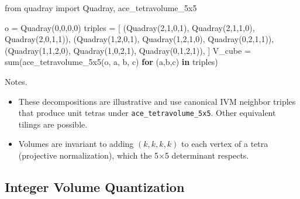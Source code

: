\documentclass[
]{article}
\newenvironment{Shaded}{}{}
\newcommand{\BuiltInTok}[1]{#1}
\newcommand{\ControlFlowTok}[1]{\textcolor[rgb]{0.00,0.44,0.13}{\textbf{#1}}}
\newcommand{\DecValTok}[1]{\textcolor[rgb]{0.25,0.63,0.44}{#1}}
\newcommand{\ImportTok}[1]{#1}
\newcommand{\KeywordTok}[1]{\textcolor[rgb]{0.00,0.44,0.13}{\textbf{#1}}}
\newcommand{\NormalTok}[1]{#1}
\newcommand{\OperatorTok}[1]{\textcolor[rgb]{0.40,0.40,0.40}{#1}}
\providecommand{\tightlist}{%
  \setlength{\itemsep}{0pt}\setlength{\parskip}{0pt}}
\begin{document}
\begin{Shaded}
\begin{Highlighting}[]
\ImportTok{from}\NormalTok{ quadray }\ImportTok{import}\NormalTok{ Quadray, ace\_tetravolume\_5x5}

\NormalTok{o }\OperatorTok{=}\NormalTok{ Quadray(}\DecValTok{0}\NormalTok{,}\DecValTok{0}\NormalTok{,}\DecValTok{0}\NormalTok{,}\DecValTok{0}\NormalTok{)}
\NormalTok{triples }\OperatorTok{=}\NormalTok{ [}
\NormalTok{    (Quadray(}\DecValTok{2}\NormalTok{,}\DecValTok{1}\NormalTok{,}\DecValTok{0}\NormalTok{,}\DecValTok{1}\NormalTok{), Quadray(}\DecValTok{2}\NormalTok{,}\DecValTok{1}\NormalTok{,}\DecValTok{1}\NormalTok{,}\DecValTok{0}\NormalTok{), Quadray(}\DecValTok{2}\NormalTok{,}\DecValTok{0}\NormalTok{,}\DecValTok{1}\NormalTok{,}\DecValTok{1}\NormalTok{)),}
\NormalTok{    (Quadray(}\DecValTok{1}\NormalTok{,}\DecValTok{2}\NormalTok{,}\DecValTok{0}\NormalTok{,}\DecValTok{1}\NormalTok{), Quadray(}\DecValTok{1}\NormalTok{,}\DecValTok{2}\NormalTok{,}\DecValTok{1}\NormalTok{,}\DecValTok{0}\NormalTok{), Quadray(}\DecValTok{0}\NormalTok{,}\DecValTok{2}\NormalTok{,}\DecValTok{1}\NormalTok{,}\DecValTok{1}\NormalTok{)),}
\NormalTok{    (Quadray(}\DecValTok{1}\NormalTok{,}\DecValTok{1}\NormalTok{,}\DecValTok{2}\NormalTok{,}\DecValTok{0}\NormalTok{), Quadray(}\DecValTok{1}\NormalTok{,}\DecValTok{0}\NormalTok{,}\DecValTok{2}\NormalTok{,}\DecValTok{1}\NormalTok{), Quadray(}\DecValTok{0}\NormalTok{,}\DecValTok{1}\NormalTok{,}\DecValTok{2}\NormalTok{,}\DecValTok{1}\NormalTok{)),}
\NormalTok{]}
\NormalTok{V\_cube }\OperatorTok{=} \BuiltInTok{sum}\NormalTok{(ace\_tetravolume\_5x5(o, a, b, c) }\ControlFlowTok{for}\NormalTok{ (a,b,c) }\KeywordTok{in}\NormalTok{ triples)}
\end{Highlighting}
\end{Shaded}

Notes.

\begin{itemize}
\tightlist
\item
  These decompositions are illustrative and use canonical IVM neighbor
  triples that produce unit tetras under \texttt{ace\_tetravolume\_5x5}.
  Other equivalent tilings are possible.
\item
  Volumes are invariant to adding \((k,k,k,k)\) to each vertex of a
  tetra (projective normalization), which the 5×5 determinant respects.
\end{itemize}

\hypertarget{sec:integer_volume}{%
\subsection{Integer Volume Quantization}\label{sec:integer_volume}}
\end{document}
